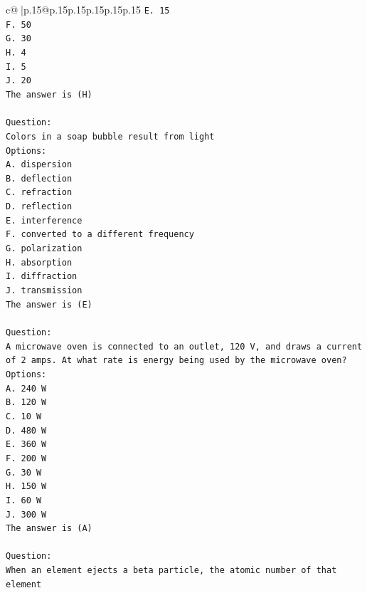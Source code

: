 \documentclass{article}
\begin{document}
{\begin{supertabular}{c@{$\;$}|p{.15\linewidth}@{}p{.15\linewidth}p{.15\linewidth}p{.15\linewidth}p{.15\linewidth}p{.15\linewidth}}
{{{\texttt{E. 15} \\
\texttt{F. 50} \\
\texttt{G. 30} \\
\texttt{H. 4} \\
\texttt{I. 5} \\
\texttt{J. 20} \\
\texttt{The answer is (H)} \\
\\ 
\texttt{Question:} \\
\texttt{Colors in a soap bubble result from light} \\
\texttt{Options:} \\
\texttt{A. dispersion} \\
\texttt{B. deflection} \\
\texttt{C. refraction} \\
\texttt{D. reflection} \\
\texttt{E. interference} \\
\texttt{F. converted to a different frequency} \\
\texttt{G. polarization} \\
\texttt{H. absorption} \\
\texttt{I. diffraction} \\
\texttt{J. transmission} \\
\texttt{The answer is (E)} \\
\\ 
\texttt{Question:} \\
\texttt{A microwave oven is connected to an outlet, 120 V, and draws a current of 2 amps. At what rate is energy being used by the microwave oven?} \\
\texttt{Options:} \\
\texttt{A. 240 W} \\
\texttt{B. 120 W} \\
\texttt{C. 10 W} \\
\texttt{D. 480 W} \\
\texttt{E. 360 W} \\
\texttt{F. 200 W} \\
\texttt{G. 30 W} \\
\texttt{H. 150 W} \\
\texttt{I. 60 W} \\
\texttt{J. 300 W} \\
\texttt{The answer is (A)} \\
\\ 
\texttt{Question:} \\
\texttt{When an element ejects a beta particle, the atomic number of that element} \\
}}}
\end{supertabular}}
\end{document}
